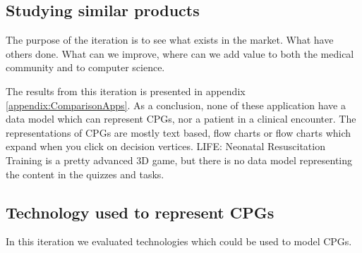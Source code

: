 \subsection{Studying similar products}
The purpose of the iteration is to see what exists in the market. What have others done. What can we improve, where can we add value to both the medical community and to computer science.

The results from this iteration is presented in appendix \ref{appendix:ComparisonApps}. As a conclusion, none of these application have a data model which can represent CPGs, nor a patient in a clinical encounter. The representations of CPGs are mostly text based, flow charts or flow charts which expand when you click on decision vertices. LIFE: Neonatal Resuscitation Training is a pretty advanced 3D game, but there is no data model representing the content in the quizzes and tasks.

\subsection{Technology used to represent CPGs}
In this iteration we evaluated technologies which could be used to model CPGs.


